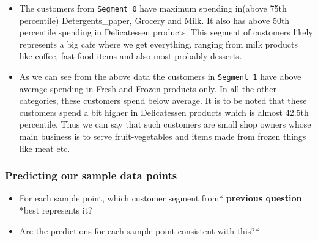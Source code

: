 \documentclass[11pt]{article}
\providecommand{\tightlist}{%
      \setlength{\itemsep}{0pt}\setlength{\parskip}{0pt}}
\begin{document}
\begin{itemize}
\item
  The customers from \texttt{Segment\ 0} have maximum spending in(above
  75th percentile) Detergents\_paper, Grocery and Milk. It also has
  above 50th percentile spending in Delicatessen products. This segment
  of customers likely represents a big cafe where we get everything,
  ranging from milk products like coffee, fast food items and also most
  probably desserts.
\item
  As we can see from the above data the customers in \texttt{Segment\ 1}
  have above average spending in Fresh and Frozen products only. In all
  the other categories, these customers spend below average. It is to be
  noted that these customers spend a bit higher in Delicatessen products
  which is almost 42.5th percentile. Thus we can say that such customers
  are small shop owners whose main business is to serve fruit-vegetables
  and items made from frozen things like meat etc.
\end{itemize}

    \subsubsection{Predicting our sample data
points}\label{predicting-our-sample-data-points}

\begin{itemize}
\tightlist
\item
  For each sample point, which customer segment from* \textbf{previous
  question} *best represents it?
\item
  Are the predictions for each sample point consistent with this?*
\end{itemize}
\end{document}
